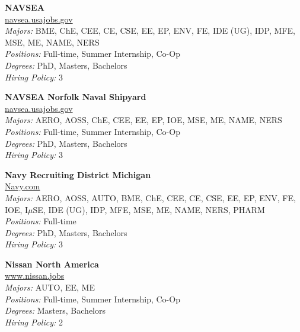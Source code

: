 \documentclass[twoside]{article}
\begin{document}
\begin{center}
\begin{multicols}{3}
\begin{minipage}{.9\columnwidth}{\Large\bf NAVSEA }\\
	\url{navsea.usajobs.gov}\\
	\emph{Majors:} BME, ChE, CEE, CE, CSE, EE, EP, ENV, FE, IDE (UG), IDP, MFE, MSE, ME, NAME, NERS\\
	\emph{Positions:} Full-time, Summer Internship, Co-Op\\
	\emph{Degrees:} PhD, Masters, Bachelors\\
	\emph{Hiring Policy:} 3\\
\end{minipage}
 
\begin{minipage}{.9\columnwidth}{\Large\bf NAVSEA Norfolk Naval Shipyard }\\
	\url{navsea.usajobs.gov}\\
	\emph{Majors:} AERO, AOSS, ChE, CEE, EE, EP, IOE, MSE, ME, NAME, NERS\\
	\emph{Positions:} Full-time, Summer Internship, Co-Op\\
	\emph{Degrees:} PhD, Masters, Bachelors\\
	\emph{Hiring Policy:} 3\\
\end{minipage}
 
\begin{minipage}{.9\columnwidth}{\Large\bf Navy Recruiting District Michigan }\\
	\url{Navy.com}\\
	\emph{Majors:} AERO, AOSS, AUTO, BME, ChE, CEE, CE, CSE, EE, EP, ENV, FE, IOE, I$\mu$SE, IDE (UG), IDP, MFE, MSE, ME, NAME, NERS, PHARM\\
	\emph{Positions:} Full-time\\
	\emph{Degrees:} PhD, Masters, Bachelors\\
	\emph{Hiring Policy:} 3\\
\end{minipage}
 
\begin{minipage}{.9\columnwidth}{\Large\bf Nissan North America }\\
	\url{www.nissan.jobs}\\
	\emph{Majors:} AUTO, EE, ME\\
	\emph{Positions:} Full-time, Summer Internship, Co-Op\\
	\emph{Degrees:} Masters, Bachelors\\
	\emph{Hiring Policy:} 2\\
\end{minipage}
 

\end{multicols}
\end{center}
\end{document}

